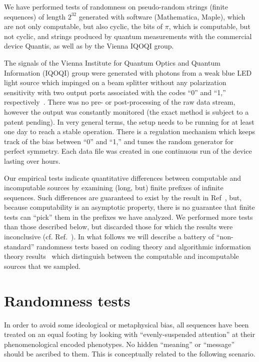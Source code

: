 \documentclass[%
 preprint,
 showpacs,
 showkeys,
 preprintnumbers,
 amsmath,amssymb,
 aps,
 prl,
  longbibliography,
 ]{revtex4-1}
\begin{document}
We have performed
tests of randomness on pseudo-random strings (finite sequences) of length $2^{32}$ generated with software
(Mathematica, Maple),  which are not only computable, but also cyclic, the bits of $\pi$, which is computable, but not cyclic, and strings produced by quantum measurements with the commercial device Quantis, as well as  by the Vienna IQOQI group.



The signals of the Vienna Institute for Quantum Optics and Quantum
Information (IQOQI)
group were generated with photons from a weak blue LED light source which impinged on a
beam splitter
without any polarization sensitivity with two output ports associated
with the codes ``0'' and ``1,'' respectively~\cite{zeilinger:qct}.
There was no pre- or post-processing of the raw data stream,
however the output was constantly monitored
(the exact method is subject to a patent pending).
In very general terms, the setup needs to be running for at least one
day to reach a stable operation.
There is a regulation mechanism which keeps track of the bias between
``0'' and ``1,''
and  tunes the random generator for perfect symmetry.
Each data file was created in one continuous run of the device
lasting over hours.





Our empirical tests indicate quantitative differences between computable
and incomputable sources by examining (long, but)
finite prefixes of infinite sequences.
Such differences are guaranteed to exist by the result in Ref~\cite{2008-cal-svo}, but, because computability is an asymptotic property,
there is no guarantee that
finite tests can ``pick'' them  in the prefixes we have analyzed.
We performed more tests than those described below, but discarded
those for which the results were inconclusive  (cf. Ref.~\cite{Rukhin-nist}).
In what follows we will describe
a battery of ``non-standard'' randomness tests based on coding theory and
algorithmic information theory results~\cite{calude:02}  which distinguish
between the  computable
and incomputable sources that we sampled.



\section{Randomness tests}

\label{tests}
In order to avoid some ideological or metaphysical bias, all
sequences have been treated on an equal footing by looking with
``evenly-suspended attention'' at their phenomenological encoded
phenotypes. No hidden ``meaning'' or ``message'' should be ascribed to them.
This is conceptually related to the following scenario.
\end{document}

